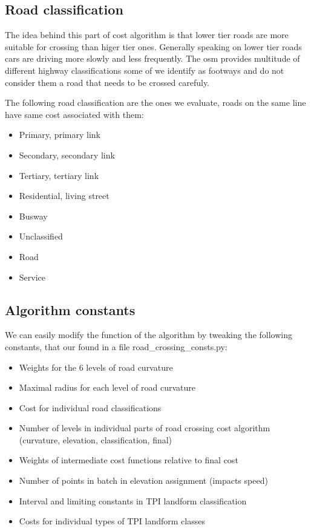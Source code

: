 \documentclass[oneside]{article}
\begin{document}
        \subsection*{Road classification}
        The idea behind this part of cost algorithm is that lower tier roads are more suitable for crossing than higer tier ones. Generally speaking on lower tier roads cars are driving more slowly and less frequently. The osm provides multitude of different highway classifications some of we identify as footways and do not consider them a road that needs to be crossed carefuly.

        \noindent The following road classification are the ones we evaluate, roads on the same line have same cost associated with them:
        \begin{itemize}
            \item Primary, primary link
            \item Secondary, secondary link
            \item Tertiary, tertiary link
            \item Residential, living street
            \item Busway
            \item Unclassified
            \item Road
            \item Service
        \end{itemize}

        \subsection{Algorithm constants}
        We can easily modify the function of the algorithm by tweaking the following constants, that our found in a file road\_crossing\_consts.py:
        \begin{itemize}
            \item Weights for the 6 levels of road curvature
            \item Maximal radius for each level of road curvature
            \item Cost for individual road classifications
            \item Number of levels in individual parts of road crossing cost algorithm (curvature, elevation, classification, final)
            \item Weights of intermediate cost functions relative to final cost
            \item Number of points in batch in elevation assignment (impacts speed)
            \item Interval and limiting constants in TPI landform classification
            \item Costs for individual types of TPI landform classes
        \end{itemize}
\end{document}
